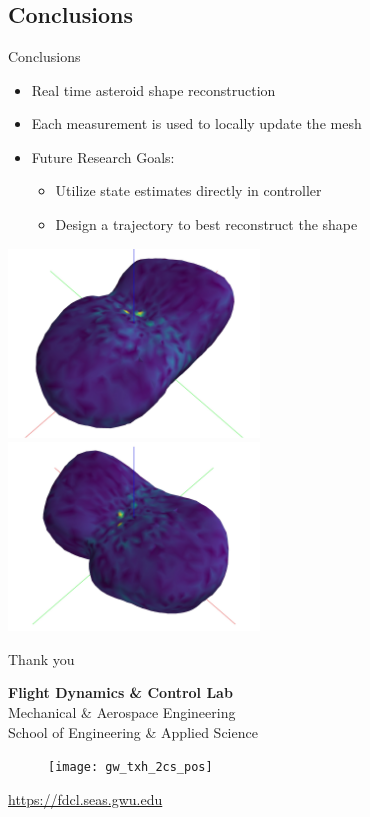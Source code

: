 \documentclass[11pt,professionalfonts]{beamer}
\begin{document}
\section*{}
\subsection*{Conclusions}

\begin{frame}{Conclusions}
    \begin{itemize}
        \item Real time asteroid shape reconstruction 
        \item Each measurement is used to locally update the mesh
        \item Future Research Goals:
            \begin{itemize}
                \item Utilize state estimates directly in controller
                \item Design a trajectory to best reconstruct the shape
            \end{itemize}
    \end{itemize} 

    \begin{center}
        \includegraphics[width=0.5\textwidth,keepaspectratio]{figures/castalia/final_az=45_el=30.jpg}~
        \includegraphics[width=0.5\textwidth, keepaspectratio]{figures/castalia/final_az=315_el=30.jpg}
    \end{center}
\end{frame}

\begin{frame}[c]{Thank you}
  \centering
  
  \textbf{\large Flight Dynamics \& Control Lab} \\
  Mechanical \& Aerospace Engineering \\
  School of Engineering \& Applied Science
  
  \begin{figure} %
        \texttt{[image: gw\_txh\_2cs\_pos]}
    \end{figure}
  
  \url{https://fdcl.seas.gwu.edu}
\end{frame}
\end{document}
